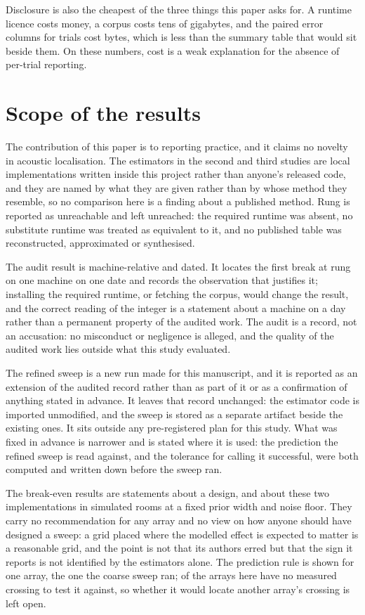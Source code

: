 Disclosure is also the cheapest of the three things this paper asks for. A
runtime licence costs money, a corpus costs tens of gigabytes, and the paired
error columns for \CxPlanned{} trials cost \CxBytesMinimal{} bytes, which is
less than the summary table that would sit beside them. On these numbers, cost
is a weak explanation for the absence of per-trial reporting.

\section{Scope of the results}

The contribution of this paper is to reporting practice, and it claims no
novelty in acoustic localisation. The estimators in the second and third studies
are local implementations written inside this project rather than anyone's
released code, and they are named by what they are given rather than by whose
method they resemble, so no comparison here is a finding about a published
method. Rung \NRungs{} is reported as unreachable and left unreached: the
required runtime was absent, no substitute runtime was treated as equivalent to
it, and no published table was reconstructed, approximated or synthesised.

The audit result is machine-relative and dated. It locates the first break at
rung \FirstBreak{} on one machine on one date and records the observation that
justifies it; installing the required runtime, or fetching the corpus, would
change the result, and the correct reading of the integer is a statement about
a machine on a day rather than a permanent property of the audited work. The
audit is a record, not an accusation: no misconduct or negligence is alleged,
and the quality of the audited work lies outside what this study evaluated.

The refined sweep is a new run made for this manuscript, and it is reported as
an extension of the audited record rather than as part of it or as a
confirmation of anything stated in advance. It leaves that record unchanged: the
estimator code is imported unmodified, and the sweep is stored as a separate
artifact beside the existing ones. It sits outside any pre-registered plan for
this study. What was fixed in advance is narrower and is stated where it is
used: the prediction the refined sweep is read against, and the tolerance for
calling it successful, were both computed and written down before the sweep ran.

The break-even results are statements about a design, and about these two
implementations in simulated rooms at a fixed prior width and noise floor. They
carry no recommendation for any array and no view on how anyone should have
designed a sweep: a grid placed where the modelled effect is expected to matter
is a reasonable grid, and the point is not that its authors erred but that the
sign it reports is not identified by the estimators alone. The prediction rule
is shown for one array, the one the coarse sweep ran; \CensoredRooms{} of the
arrays here have no measured crossing to test it against, so whether it would
locate another array's crossing is left open.

